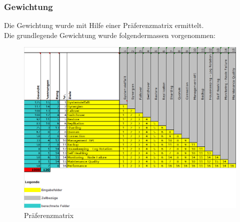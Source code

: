 \subsubsection{Gewichtung}
\begin{flushleft}
    Die Gewichtung wurde mit Hilfe einer Präferenzmatrix ermittelt.\\

    Die grundlegende Gewichtung wurde folgendermassen vorgenommen:
    \begin{figure}[H]
        \centering
        \includegraphics[width=1\linewidth]{source/implementation/evaluation/requirements/preference_matrix}
        \caption{Präferenzmatrix}
        \label{fig:preference_matrix}
    \end{figure}
\end{flushleft}
